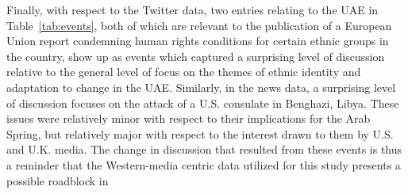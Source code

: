 Finally, with respect to the Twitter data, two entries relating to the UAE in Table~\ref{tab:events}, both of which are relevant to the publication of a European Union report condemning human rights conditions for certain ethnic groups in the country, show up as events which captured a surprising level of discussion relative to the general level of focus on the themes of ethnic identity and adaptation to change in the UAE. Similarly, in the news data, a surprising level of discussion focuses on the attack of a U.S. consulate in Benghazi, Libya.  These issues were relatively minor with respect to their implications for the Arab Spring, but relatively major with respect to the interest drawn to them by U.S. and U.K. media.  The change in discussion that resulted from these events is thus a reminder that the Western-media centric data utilized for this study presents a possible roadblock in 

